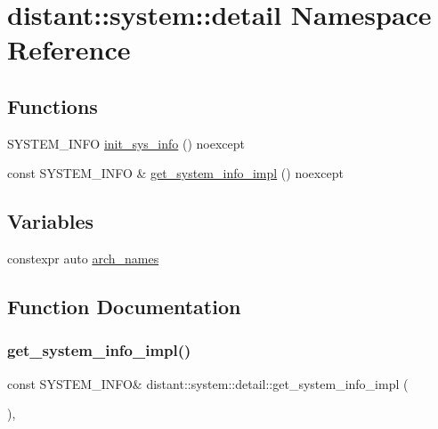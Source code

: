 \hypertarget{namespacedistant_1_1system_1_1detail}{}\section{distant\+:\+:system\+:\+:detail Namespace Reference}
\label{namespacedistant_1_1system_1_1detail}
\subsection*{Functions}
\begin{DoxyCompactItemize}
\item 
S\+Y\+S\+T\+E\+M\+\_\+\+I\+N\+FO \mbox{\hyperlink{namespacedistant_1_1system_1_1detail_ac887ec70d624331d3e4d6edca2770f63}{init\+\_\+sys\+\_\+info}} () noexcept
\item 
const S\+Y\+S\+T\+E\+M\+\_\+\+I\+N\+FO \& \mbox{\hyperlink{namespacedistant_1_1system_1_1detail_a90158cac992996166f0c5fd64dbe28be}{get\+\_\+system\+\_\+info\+\_\+impl}} () noexcept
\end{DoxyCompactItemize}
\subsection*{Variables}
\begin{DoxyCompactItemize}
\item 
constexpr auto \mbox{\hyperlink{namespacedistant_1_1system_1_1detail_aed72f4bdd1952c37cc2cdb3c618c3e86}{arch\+\_\+names}}
\end{DoxyCompactItemize}


\subsection{Function Documentation}
\mbox{\label{namespacedistant_1_1system_1_1detail_a90158cac992996166f0c5fd64dbe28be}} 
\subsubsection{\texorpdfstring{get\+\_\+system\+\_\+info\+\_\+impl()}{get\_system\_info\_impl()}}
{\footnotesize\ttfamily const S\+Y\+S\+T\+E\+M\+\_\+\+I\+N\+FO\& distant\+::system\+::detail\+::get\+\_\+system\+\_\+info\+\_\+impl (\begin{DoxyParamCaption}{ }\end{DoxyParamCaption})\hspace{0.3cm}{\ttfamily [inline]}, {\ttfamily [noexcept]}}

